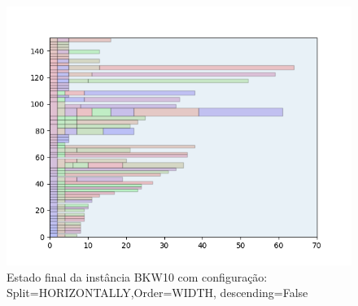 \begin{figure}[H]
    \centering
    \caption[]{Estado final da instância BKW10 com configuração: Split=HORIZONTALLY,Order=WIDTH, descending=False}
    \label{fig:bkw10-horizontally-width-false}
    \includegraphics[scale=0.5]{output/figures/bkw/bkw10/horizontally/width/false/000}
\end{figure}